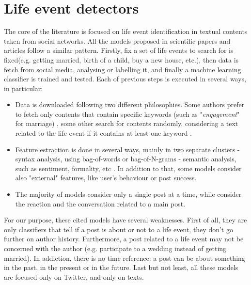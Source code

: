 \section{Life event detectors}
\label{sec:classifiers}
The core of the literature is focused on life event identification in textual contents taken from social networks. All the models proposed in scientific papers and articles follow a similar pattern. Firstly, fix a set of life events to search for is fixed(e.g. getting married, birth of a child, buy a new house, etc.), then data is fetch from social media, analysing or labelling it, and finally a machine learning classifier is trained and tested. Each of previous steps is executed in several ways, in particular:
\begin{itemize}
\item Data is downloaded following two different philosophies. Some authors prefer to fetch only contents that contain specific keywords (such as "\textit{engagement}" for marriage) \cite{dickinson2015identifying, cavalinclassification, moyanolife, khobarekar2013detecting}, some other search for contents randomly, considering a text related to the life event if it contains at least one keyword \cite{choudhury2014personal, di2013detecting}.
\item Feature estraction is done in several ways, mainly in two separate clusters - syntax analysis, using bag-of-words or bag-of-N-grams \cite{cavalinclassification, di2013detecting, li2014major} - semantic analysis, such as sentiment, formality, etc \cite{khobarekar2013detecting}. In addition to that, some models consider also "external" features, like user's behaviour or post success.
\item The majority of models consider only a single post at a time, while \cite{cavalin2015multiple, moyanolife} consider the reaction and the conversation related to a main post.
\end{itemize}
For our purpose, these cited models have several weaknesses. First of all, they are only classifiers that tell if a post is about or not to a life event, they don't go further on author history. Furthermore, a post related to a life event may not be concerned with the author (e.g. participate to a wedding instead of getting married). In addiction, there is no time reference: a post can be about something in the past, in the present or in the future. Last but not least, all these models are focused only on Twitter, and only on texts.